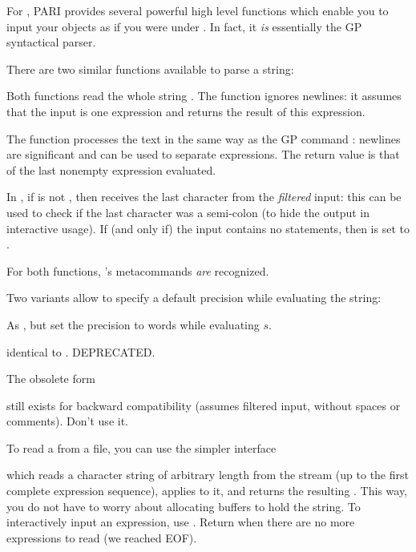 
\noindent
For , PARI provides several powerful high level functions
which enable you to input your objects as if you were under . In fact,
it \emph{is} essentially the GP syntactical parser.

There are two similar functions available to parse a string:

\label{se:gp_read_str}


\noindent
Both functions read the whole string . The function
 ignores newlines: it assumes that the input is one
expression and returns the result of this expression.

The function  processes the text in the
same way as the GP command : newlines are significant and can
be used to separate expressions.
The return value is that of the last nonempty expression evaluated.

In , if  is not ,
then  receives the last character from the \emph{filtered}
input: this can be used to check if the last character was a semi-colon
(to hide the output in interactive usage). If (and only if) the
input contains no statements, then  is set to .

For both functions, 's metacommands \emph{are} recognized.

Two variants allow to specify a default precision while evaluating the
string:

As , but set the precision to  words while evaluating $s$.

 identical to
. DEPRECATED.

 The obsolete form


still exists for backward compatibility (assumes filtered input, without
spaces or comments). Don't use it.

To read a  from a file, you can use the simpler interface


\noindent which reads a character string of arbitrary length from the stream
 (up to the first complete expression sequence), applies
 to it, and returns the resulting . This way, you
do not have to worry about allocating buffers to hold the string. To
interactively input an expression, use .
Return  when there are no more expressions to read (we reached
EOF).

